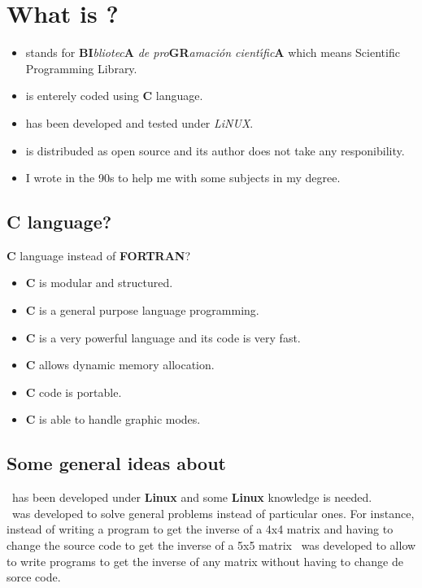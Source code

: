 %
%

\chapter{What is \BI?}

\begin{itemize}

\item \BI stands for \textbf{BI}\emph{bliotec}\textbf{A} \emph{de pro}\textbf{GR}\emph{amaci\'on cient\'{\i}fic}\textbf{A} which means Scientific Programming Library.
\item \BI is enterely coded using \textbf{C} language.
\item \BI has been developed and tested under \emph{LiNUX}.
\item \BI is distribuded as open source and its author does not take any responibility.
\item I wrote \BI in the 90s to help me with some subjects in my degree.

\end{itemize}

\section{C language?}

\textbf{C} language instead of \textbf{FORTRAN}?
%
\begin{itemize}
\item \textbf{C} is modular and structured.
\item \textbf{C} is a general purpose language programming.
\item \textbf{C} is a very powerful language and its code is very fast.
\item \textbf{C} allows dynamic memory allocation.
\item \textbf{C} code is portable.
\item \textbf{C} is able to handle graphic modes. 
\end{itemize}

\section{Some general ideas about \BI}

\BI\ has been developed under \textbf{Linux} and some \textbf{Linux} knowledge is needed.\\

\BI\ was developed to solve general problems instead of particular ones. For instance, instead of writing a program to get the inverse of a 4x4 matrix and having to change the source code to get the inverse of a 5x5 matrix \BI\ was developed to allow to write programs to get the inverse of any matrix without having to change de sorce code.\\

